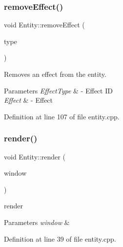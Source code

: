 \subsubsection{\texorpdfstring{remove\+Effect()}{removeEffect()}}
{\footnotesize\ttfamily void Entity\+::remove\+Effect (\begin{DoxyParamCaption}\item[{\hyperlink{namespacens_game_afea521dd2ba8e97be9549ce9936f4522}{Effect\+Type}}]{type }\end{DoxyParamCaption})}



Removes an effect from the entity. 


\begin{DoxyParams}{Parameters}
{\em Effect\+Type} & -\/ Effect ID \\
\hline
{\em Effect} & -\/ Effect \\
\hline
\end{DoxyParams}


Definition at line 107 of file entity.\+cpp.

\mbox{\label{structns_game_1_1_entity_a4663cc85381acc9aaac120a85b6f24d0}} 
\subsubsection{\texorpdfstring{render()}{render()}}
{\footnotesize\ttfamily void Entity\+::render (\begin{DoxyParamCaption}\item[{Min\+GL \&}]{window }\end{DoxyParamCaption})}



render 


\begin{DoxyParams}{Parameters}
{\em window} & \\
\hline
\end{DoxyParams}


Definition at line 39 of file entity.\+cpp.

